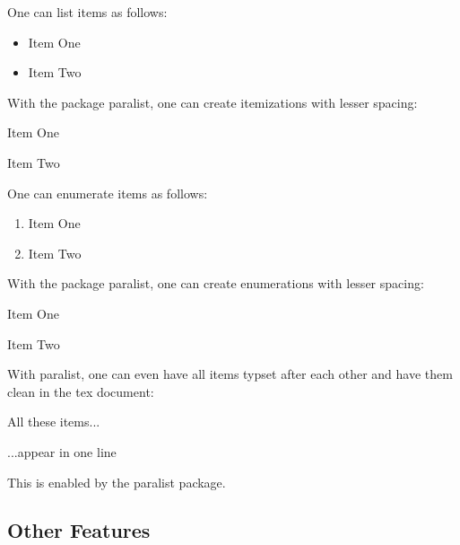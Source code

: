 \documentclass[conference,a4paper]{IEEEtran}[2015/08/26]
\begin{document}
One can list items as follows:

\begin{ltgexample}
\begin{itemize}
\item Item One
\item Item Two
\end{itemize}
\end{ltgexample}

With the package paralist, one can create itemizations with lesser spacing:

\begin{ltgexample}
\begin{compactitem}
\item Item One
\item Item Two
\end{compactitem}
\end{ltgexample}

One can enumerate items as follows:

\begin{ltgexample}
\begin{enumerate}
  \item Item One
  \item Item Two
\end{enumerate}
\end{ltgexample}

With the package paralist, one can create enumerations with lesser spacing:

\begin{ltgexample}
\begin{compactenum}
  \item Item One
  \item Item Two
\end{compactenum}
\end{ltgexample}

With paralist, one can even have all items typset after each other and have them clean in the tex document:

\begin{ltgexample}
\begin{inparaenum}
  \item All these items...
  \item ...appear in one line
  \item This is enabled by the paralist package.
\end{inparaenum}
\end{ltgexample}

\subsection{Other Features}
\end{document}
